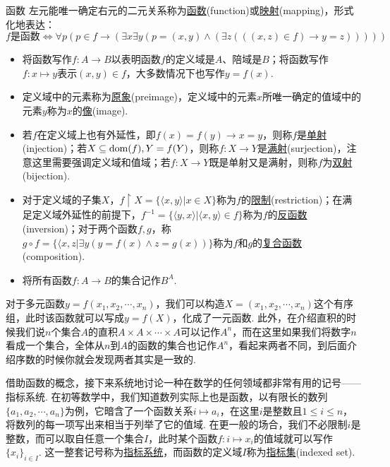 \documentclass[main.tex]{subfiles}
\begin{document}
\begin{definition}{函数}
    左元能唯一确定右元的二元关系称为\uline{函数}(function)或\uline{映射}(mapping)，形式化地表达：
    \[f \mbox{是函数} \Longleftrightarrow \forall p (p \in f \rightarrow (\exists x \exists y(p = (x,y) \wedge (\exists z(((x,z ) \in f) \rightarrow y=z)))))\]
    \begin{itemize}
        \item  将函数写作\(f:A \to B\)以表明函数\(f\)的定义域是\(A\)、陪域是\(B\)；将函数写作\(f:x \mapsto y\)表示\((x,y) \in f\)，大多数情况下也写作\(y=f(x)\).
        \item  定义域中的元素称为\uline{原象}(preimage)，定义域中的元素\(x\)所唯一确定的值域中的元素\(y\)称为\(x\)的\uline{像}(image).
        \item  若\(f\)在定义域上也有外延性，即\(f(x)=f(y) \rightarrow x=y\)，则称\(f\)是\uline{单射}(injection)；若\(X\subseteq{\rm dom}(f), Y=f(Y)\)，则称\(f:X\to Y\)是\uline{满射}(surjection)，注意这里需要强调定义域和值域；若\(f:X \to Y\)既是单射又是满射，则称\(f\)为\uline{双射}(bijection).
        \item  对于定义域的子集\(X\)，\(f\upharpoonright X=\{\langle x,y \rangle|x \in X\}\)称为\(f\)的\uline{限制}(restriction)；在满足定义域外延性的前提下，\(f^{-1}=\{\langle y,x \rangle | \langle x,y \rangle \in f\}\)称为\(f\)的\uline{反函数}(inversion)；对于两个函数\(f,g\)，称\(g \circ f = \{\langle x,z | \exists y(y=f(x) \wedge z=g(x))\}\)称为\(f\)和\(g\)的\uline{复合函数}(composition).
        \item  将所有函数\(f:A \to B\)的集合记作\(B^A\).
    \end{itemize}
\end{definition}

对于多元函数\(y = f(x_1,x_2,\cdots,x_n)\)，我们可以构造\(X = (x_1,x_2,\cdots,x_n)\)这个有序组，此时该函数就可以写成\(y = f(X)\)，化成了一元函数. 此外，在介绍直积的时候我们说\(n\)个集合\(A\)的直积\(A \times A \times \cdots \times A\)可以记作\(A^n\)，而在这里如果我们将数字\(n\)看成一个集合，全体从\(n\)到\(A\)的函数的集合也记作\(A^n\)，看起来两者不同，到后面介绍序数的时候你就会发现两者其实是一致的.

借助函数的概念，接下来系统地讨论一种在数学的任何领域都非常有用的记号——指标系统. 在初等数学中，我们知道数列实际上也是函数，以有限长的数列\(\{a_1,a_2,\cdots,a_n\}\)为例，它暗含了一个函数关系\(i \mapsto a_i\)，在这里\(i\)是整数且\(1 \leq i \leq n\)，将数列的每一项写出来相当于列举了它的值域. 在更一般的场合，我们不必限制\(i\)是整数，而可以取自任意一个集合\(I\)，此时某个函数\(f: i \mapsto x_i\)的值域就可以写作\(\{x_i\}_{i \in I}\). 这一整套记号称为\uline{指标系统}，而函数的定义域\(I\)称为\uline{指标集}(indexed set).
\end{document}
